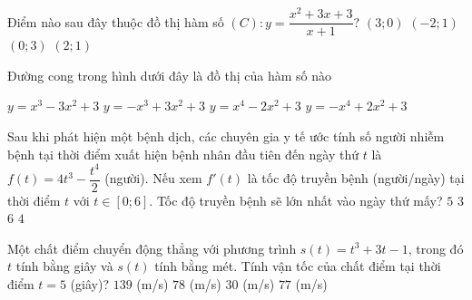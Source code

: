 \begin{ex}%
	Điểm nào sau đây thuộc đồ thị hàm số $\left(C \right) \colon y=\dfrac{x^2+3x+3}{x+1}$?
	\choice
	{$\left(3;0 \right)$}
	{$\left(-2;1 \right)$}
	{\True $\left(0;3 \right)$}
	{$\left(2;1 \right)$}
\end{ex}

\begin{ex}%
	Đường cong trong hình dưới đây là đồ thị của hàm số nào
	\begin{center}
	\end{center}
	\choice
	{\True $y=x^3-3x^2+3$}
	{$y=-x^3+3x^2+3$}
	{$y=x^4-2x^2+3$}
	{$y=-x^4+2x^2+3$}
\end{ex}

\begin{ex}%
	Sau khi phát hiện một bệnh dịch, các chuyên gia y tế ước tính số người nhiễm bệnh tại thời điểm xuất hiện bệnh nhân đầu tiên đến ngày thứ $t$ là $f(t)=4 t^{3}-\dfrac{t^{4}}{2}$ (người).  Nếu xem $f'(t)$ là tốc độ truyền bệnh (người/ngày) tại thời điểm $t$ với $t \in[0 ; 6]$. Tốc độ truyền bệnh sẽ lớn nhất vào ngày thứ mấy?
	\choice
	{$5$}
	{$3$}
	{$6$}
	{\True $4$}
\end{ex}

\begin{ex}%
	Một chất điểm chuyển động thẳng với phương trình $s(t)=t^3+3t-1$, trong đó $t$ tính bằng giây và $s(t)$ tính bằng mét. Tính vận tốc của chất điểm tại thời điểm $t=5$ (giây)?
	\choice
	{$139$ (m/s)}
	{\True $78$ (m/s)}
	{$30$ (m/s)}
	{$77$ (m/s)}
\end{ex}

